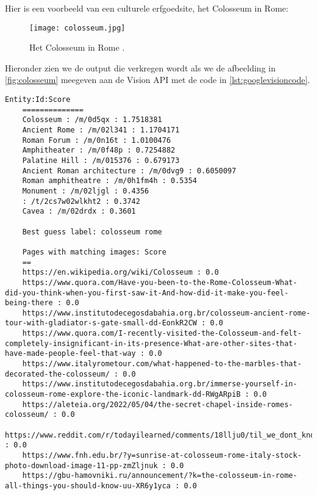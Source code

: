 Hier is een voorbeeld van een culturele erfgoedsite, het Colosseum in Rome:

\begin{figure}[h!]
    \centering
    \texttt{[image: colosseum.jpg]}
    \caption{Het Colosseum in Rome \autocite{wikimediaColosseum}.}
    \label{fig:colosseum}
\end{figure}
\pagebreak

Hieronder zien we de output die verkregen wordt als we de afbeelding in \autoref{fig:colosseum} meegeven aan de Vision API met de code in \autoref{lst:googlevisioncode}.

\begin{lstlisting}[caption={Output vision api},label={lst:outputvisionapi}]
    Entity:Id:Score
    ==============
    Colosseum : /m/0d5qx : 1.7518381
    Ancient Rome : /m/02l341 : 1.1704171
    Roman Forum : /m/0n16t : 1.0100476
    Amphitheater : /m/0f48p : 0.7254882
    Palatine Hill : /m/015376 : 0.679173
    Ancient Roman architecture : /m/0dvg9 : 0.6050097
    Roman amphitheatre : /m/0h1fm4h : 0.5354
    Monument : /m/02ljgl : 0.4356
    : /t/2cs7w02wlkht2 : 0.3742
    Cavea : /m/02drdx : 0.3601
    
    Best guess label: colosseum rome
    
    Pages with matching images: Score
    ==
    https://en.wikipedia.org/wiki/Colosseum : 0.0
    https://www.quora.com/Have-you-been-to-the-Rome-Colosseum-What-did-you-think-when-you-first-saw-it-And-how-did-it-make-you-feel-being-there : 0.0
    https://www.institutodecegosdabahia.org.br/colosseum-ancient-rome-tour-with-gladiator-s-gate-small-dd-EonkR2CW : 0.0
    https://www.quora.com/I-recently-visited-the-Colosseum-and-felt-completely-insignificant-in-its-presence-What-are-other-sites-that-have-made-people-feel-that-way : 0.0
    https://www.italyrometour.com/what-happened-to-the-marbles-that-decorated-the-colosseum/ : 0.0
    https://www.institutodecegosdabahia.org.br/immerse-yourself-in-colosseum-rome-explore-the-iconic-landmark-dd-RWgARpiB : 0.0
    https://aleteia.org/2022/05/04/the-secret-chapel-inside-romes-colosseum/ : 0.0
    https://www.reddit.com/r/todayilearned/comments/18llju0/til_we_dont_know_what_the_romans_called_the/ : 0.0
    https://www.fnh.edu.br/?y=sunrise-at-colosseum-rome-italy-stock-photo-download-image-11-pp-zmZljnuk : 0.0
    https://gbu-hamovniki.ru/announcement/?k=the-colosseum-in-rome-all-things-you-should-know-uu-XR6y1yca : 0.0
    

\end{lstlisting}
